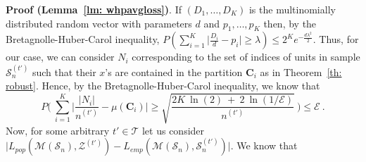 \textbf{Proof (Lemma~\ref{lm: whpavgloss})}. If $(D_1,\dots,D_K)$ is the multinomially distributed random vector with parameters $d$ and $p_1, \dots, p_K$ then, by the Bretagnolle-Huber-Carol inequality, $ P(\sum_{i=1}^{K} \Big| \frac{D_i}{d} - p_i \Big|\geq\lambda)\leq 2^K e^{-\frac{d\lambda^2}{2}}$. Thus, for our case, we can consider $N_i$ corresponding to the set of indices of units in sample $\mathcal{S}^{(t')}_n$ such that their $x$'s are contained in the partition $\mathbf{C}_{i}$ as in Theorem~\ref{th: robust}. Hence, by the Bretagnolle-Huber-Carol inequality, we know that 
$$
    P\Bigg(~ \sum_{i=1}^{K} \Big| \frac{|N_i|}{n^{(t')}} - \mu(\mathbf{C}_{i}) \Big| \geq \sqrt{\frac{2K~\ln(2)~+~2~\ln(1/\mathcal{E})}{n^{(t')}}} ~\Bigg) \leq \mathcal{E}~.
$$
Now, for some arbitrary $t'\in\mathcal{T}$ let us consider $\Big| L_{pop}(\mathcal{M}(\mathcal{S}_n),\mathcal{Z}^{(t')}) - L_{emp}(\mathcal{M}(\mathcal{S}_n),\mathcal{S}_n^{(t')}) \Big|$. 
We know that
